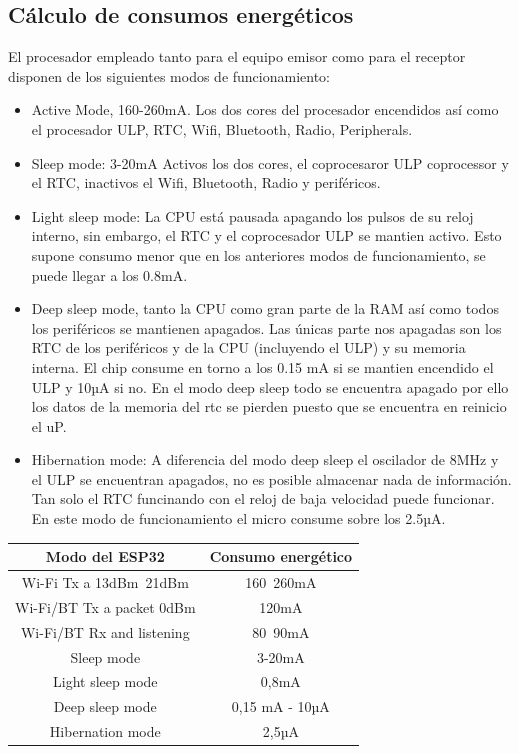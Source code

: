 \documentclass[a4paper ,12pt, onecolumn]{article}
\begin{document}
    \subsection{Cálculo de consumos energéticos}
            El procesador empleado tanto para el equipo emisor como para el receptor disponen de los siguientes modos de funcionamiento:
            \begin{itemize}
                \item  Active Mode, 160-260mA.  Los dos cores del procesador encendidos así como el procesador ULP,
                RTC, Wifi, Bluetooth, Radio, Peripherals.
                \item  Sleep mode: 3-20mA Activos los dos cores, el coprocesaror ULP coprocessor y el RTC, inactivos el 
                Wifi, Bluetooth, Radio y periféricos.
                \item  Light sleep mode: La CPU está pausada apagando los pulsos de su reloj interno, sin embargo, el RTC
                y el coprocesador ULP se mantien activo. Esto supone consumo menor que en los anteriores modos de funcionamiento,
                se puede llegar a los 0.8mA.
                \item Deep sleep mode, tanto la CPU como gran parte de la RAM así como todos los periféricos se mantienen 
                apagados. Las únicas parte nos apagadas son los RTC de los periféricos y de la CPU (incluyendo el ULP) y su
                memoria interna. El chip consume en torno a los 0.15 mA si se mantien encendido el ULP y  10µA si no.
                En el modo deep sleep todo se encuentra apagado por ello los datos de la memoria del rtc se pierden
                puesto que se encuentra en reinicio el uP.
                \item Hibernation mode: A diferencia del modo deep sleep el oscilador de 8MHz y el ULP se encuentran apagados,
                no es posible almacenar nada de información. Tan solo el RTC funcinando con el reloj de baja velocidad puede funcionar.
                En este modo de funcionamiento el micro consume sobre los 2.5µA.
            \end{itemize}
            \begin{center}
                \begin{tabular}{||c || c ||} 
                \hline
                Modo del ESP32  & Consumo energético  \\ [0.5ex] 
                \hline
                Wi-Fi Tx a 13dBm~21dBm & 160~260mA  \\ 
                Wi-Fi/BT Tx  a packet 0dBm	 & 120mA  \\
                Wi-Fi/BT Rx and listening & 80~90mA  \\
                Sleep mode &  3-20mA   \\
                Light sleep mode &0,8mA  \\
                Deep sleep mode &   0,15 mA - 10µA  \\
                Hibernation mode & 2,5µA  \\
                \hline
                \end{tabular}
            \end{center}
\end{document}
